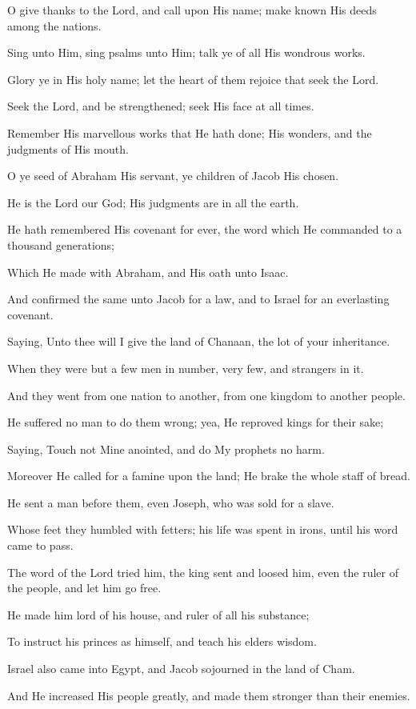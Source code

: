 O give thanks to the Lord, and call upon His name; make known His deeds among the nations.

Sing unto Him, sing psalms unto Him; talk ye of all His wondrous works.

Glory ye in His holy name; let the heart of them rejoice that seek the Lord.

Seek the Lord, and be strengthened; seek His face at all times.

Remember His marvellous works that He hath done; His wonders, and the judgments of His mouth.

O ye seed of Abraham His servant, ye children of Jacob His chosen.

He is the Lord our God; His judgments are in all the earth.

He hath remembered His covenant for ever, the word which He commanded to a thousand generations;

Which He made with Abraham, and His oath unto Isaac.

And confirmed the same unto Jacob for a law, and to Israel for an everlasting covenant.

Saying, Unto thee will I give the land of Chanaan, the lot of your inheritance.

When they were but a few men in number, very few, and strangers in it.

And they went from one nation to another, from one kingdom to another people.

He suffered no man to do them wrong; yea, He reproved kings for their sake;

Saying, Touch not Mine anointed, and do My prophets no harm.

Moreover He called for a famine upon the land; He brake the whole staff of bread.

He sent a man before them, even Joseph, who was sold for a slave.

Whose feet they humbled with fetters; his life was spent in irons, until his word came to pass.

The word of the Lord tried him, the king sent and loosed him, even the ruler of the people, and let him go free.

He made him lord of his house, and ruler of all his substance;

To instruct his princes as himself, and teach his elders wisdom.

Israel also came into Egypt, and Jacob sojourned in the land of Cham.

And He increased His people greatly, and made them stronger than their enemies.

